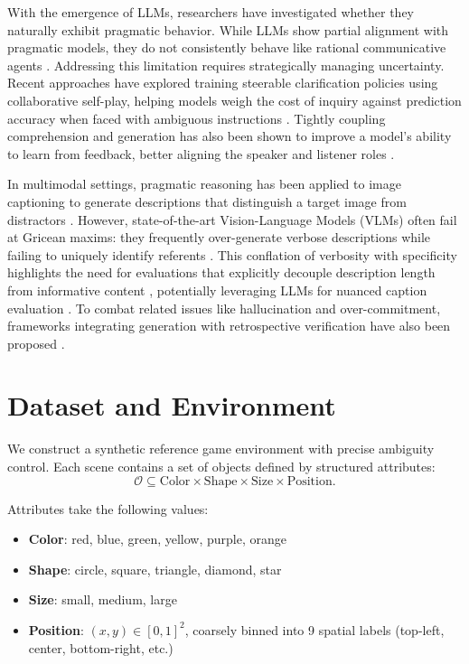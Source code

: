 \documentclass[10pt]{article}
\begin{document}
With the emergence of LLMs, researchers have investigated whether they naturally exhibit pragmatic behavior. While LLMs show partial alignment with pragmatic models, they do not consistently behave like rational communicative agents \cite{jian2024llmpragmatic}. Addressing this limitation requires strategically managing uncertainty. Recent approaches have explored training steerable clarification policies using collaborative self-play, helping models weigh the cost of inquiry against prediction accuracy when faced with ambiguous instructions \cite{berant2025steerable}. Tightly coupling comprehension and generation has also been shown to improve a model's ability to learn from feedback, better aligning the speaker and listener roles \cite{gul2024cogen}.

In multimodal settings, pragmatic reasoning has been applied to image captioning to generate descriptions that distinguish a target image from distractors \cite{ou2023clip}. However, state-of-the-art Vision-Language Models (VLMs) often fail at Gricean maxims: they frequently over-generate verbose descriptions while failing to uniquely identify referents \cite{ma2025vision}. This conflation of verbosity with specificity highlights the need for evaluations that explicitly decouple description length from informative content \cite{kapur2026when}, potentially leveraging LLMs for nuanced caption evaluation \cite{chan2023clair}. To combat related issues like hallucination and over-commitment, frameworks integrating generation with retrospective verification have also been proposed \cite{wu2025generate}.

\section{Dataset and Environment}

We construct a synthetic reference game environment with precise ambiguity control. Each scene contains a set of objects defined by structured attributes:
\[
\mathcal{O} \subseteq \text{Color} \times \text{Shape} \times \text{Size} \times \text{Position}.
\]

Attributes take the following values:
\begin{itemize}[noitemsep, topsep=0pt]
\item \textbf{Color}: red, blue, green, yellow, purple, orange
\item \textbf{Shape}: circle, square, triangle, diamond, star
\item \textbf{Size}: small, medium, large
\item \textbf{Position}: $(x,y) \in [0,1]^2$, coarsely binned into 9 spatial labels (top-left, center, bottom-right, etc.)
\end{itemize}
\end{document}
